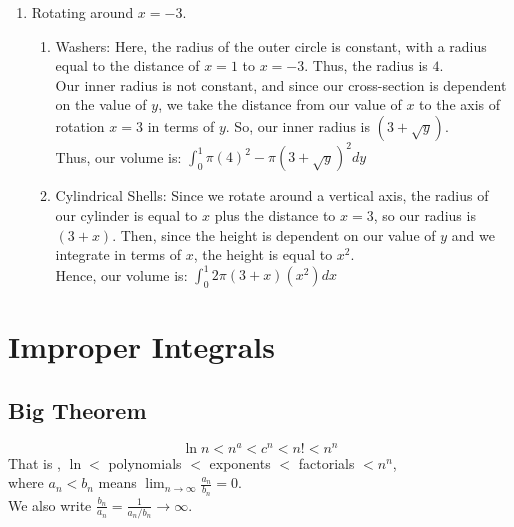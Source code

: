 \documentclass{article}
\begin{document}
\begin{enumerate}
    \item Rotating around $x = -3$.
    \begin{enumerate}
        \item Washers: Here, the radius of the outer circle is constant, with a radius equal to the distance of $x=1$ to $x=-3$. Thus, the radius is $4$.\\
        Our inner radius is not constant, and since our cross-section is dependent on the value of $y$, we take the distance from our value of $x$ to the axis of rotation $x =3$ in terms of $y$. So, our inner radius is $(3 + \sqrt{y})$.\\
        Thus, our volume is: $\int_0^1 \pi(4)^2 - \pi(3 + \sqrt{y})^2 dy$
        \item Cylindrical Shells: Since we rotate around a vertical axis, the radius of our cylinder is equal to $x$ plus the distance to $x = 3$, so our radius is $(3+x)$. Then, since the height is dependent on our value of $y$ and we integrate in terms of $x$, the height is equal to $x^2$.\\
        Hence, our volume is: $\int_0^1 2\pi (3 + x)(x^2)dx$
    \end{enumerate}
\end{enumerate}

\section{Improper Integrals}
\subsection{Big Theorem}
$$\ln n < n^a  < c^n < n! < n^n$$
That is , $\ln < $ polynomials $<$ exponents $<$ factorials $< n^n$,\\
where $a_n < b_n$ means $\lim_{n\to\infty} \frac{a_n}{b_n} = 0$.\\
We also write $\frac{b_n}{a_n} = \frac{1}{a_n/b_n} \to \infty$.
\end{document}

